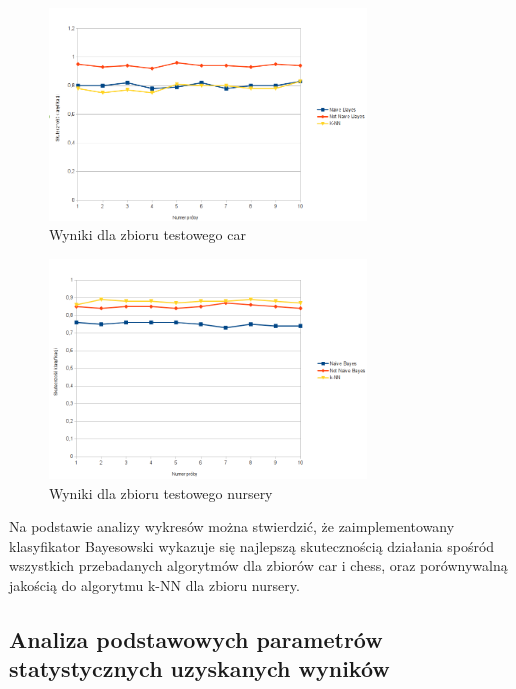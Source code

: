 \documentclass[paper=a4, fontsize=11pt]{scrartcl} %
\numberwithin{equation}{section} %
\numberwithin{figure}{section} %
\numberwithin{table}{section} %
\begin{document}
\begin{figure}[!h]
 \centering
\includegraphics[width=0.75\textwidth]{car.png}
 \caption{Wyniki dla zbioru testowego car}
 \label{fig:model_drzewa}
\end{figure}

\begin{figure}[!h]
 \centering
\includegraphics[width=0.75\textwidth]{nursery.png}
 \caption{Wyniki dla zbioru testowego nursery}
 \label{fig:model_drzewa}
\end{figure}



\clearpage

Na podstawie analizy wykresów można 
stwierdzić, że zaimplementowany klasyfikator Bayesowski wykazuje się najlepszą skutecznością działania spośród wszystkich przebadanych algorytmów dla zbiorów car i chess, oraz porównywalną jakością do algorytmu k-NN dla zbioru nursery.

\subsection{Analiza podstawowych parametrów statystycznych uzyskanych wyników}
\label{ref:wykresy_pudelkowe}
\end{document}
